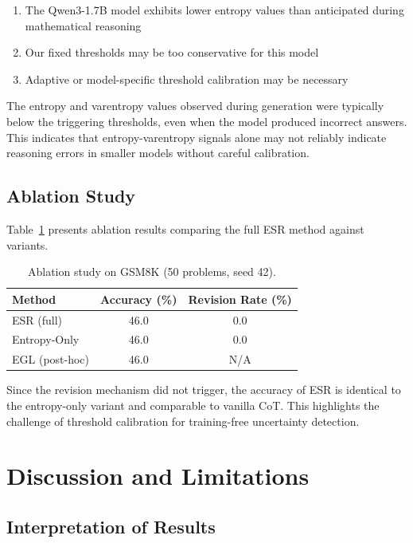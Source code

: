 \documentclass{article}
\begin{document}
\begin{enumerate}
    \item The Qwen3-1.7B model exhibits lower entropy values than anticipated during mathematical reasoning
    \item Our fixed thresholds may be too conservative for this model
    \item Adaptive or model-specific threshold calibration may be necessary
\end{enumerate}

The entropy and varentropy values observed during generation were typically below the triggering thresholds, even when the model produced incorrect answers. This indicates that entropy-varentropy signals alone may not reliably indicate reasoning errors in smaller models without careful calibration.

\subsection{Ablation Study}

Table~\ref{tab:ablation} presents ablation results comparing the full ESR method against variants.

\begin{table}[t]
\caption{Ablation study on GSM8K (50 problems, seed 42).}
\label{tab:ablation}
\centering
\begin{tabular}{lcc}
\toprule
Method & Accuracy (\%) & Revision Rate (\%) \\
\midrule
ESR (full) & 46.0 & 0.0 \\
Entropy-Only & 46.0 & 0.0 \\
EGL (post-hoc) & 46.0 & N/A \\
\bottomrule
\end{tabular}
\end{table}

Since the revision mechanism did not trigger, the accuracy of ESR is identical to the entropy-only variant and comparable to vanilla CoT. This highlights the challenge of threshold calibration for training-free uncertainty detection.

\section{Discussion and Limitations}
\label{sec:discussion}

\subsection{Interpretation of Results}
\end{document}
